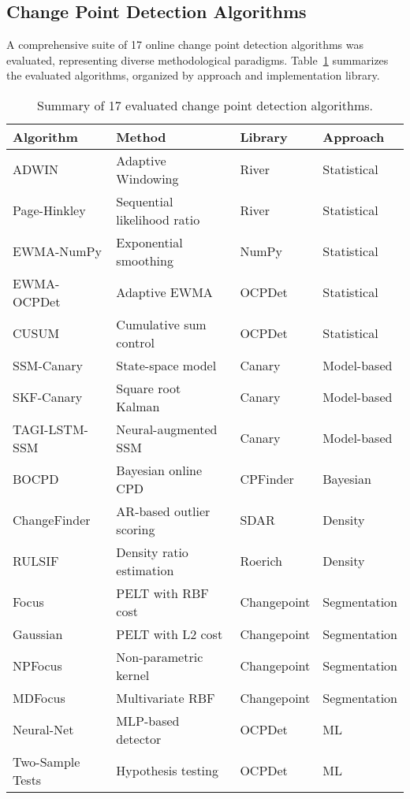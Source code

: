 \documentclass[journal,article,submit,pdftex,moreauthors]{Definitions/mdpi}
\begin{document}
\subsection{Change Point Detection Algorithms}

A comprehensive suite of 17 online change point detection algorithms was evaluated, representing diverse methodological paradigms. Table~\ref{tab:algorithms} summarizes the evaluated algorithms, organized by approach and implementation library.

\begin{table}[H]
\caption{Summary of 17 evaluated change point detection algorithms.\label{tab:algorithms}}
\centering
\begin{tabular}{llll}
\toprule
\textbf{Algorithm} & \textbf{Method} & \textbf{Library} & \textbf{Approach} \\
\midrule
ADWIN & Adaptive Windowing & River & Statistical \\
Page-Hinkley & Sequential likelihood ratio & River & Statistical \\
EWMA-NumPy & Exponential smoothing & NumPy & Statistical \\
EWMA-OCPDet & Adaptive EWMA & OCPDet & Statistical \\
CUSUM & Cumulative sum control & OCPDet & Statistical \\
\midrule
SSM-Canary & State-space model & Canary & Model-based \\
SKF-Canary & Square root Kalman & Canary & Model-based \\
TAGI-LSTM-SSM & Neural-augmented SSM & Canary & Model-based \\
\midrule
BOCPD & Bayesian online CPD & CPFinder & Bayesian \\
\midrule
ChangeFinder & AR-based outlier scoring & SDAR & Density \\
RULSIF & Density ratio estimation & Roerich & Density \\
\midrule
Focus & PELT with RBF cost & Changepoint & Segmentation \\
Gaussian & PELT with L2 cost & Changepoint & Segmentation \\
NPFocus & Non-parametric kernel & Changepoint & Segmentation \\
MDFocus & Multivariate RBF & Changepoint & Segmentation \\
\midrule
Neural-Net & MLP-based detector & OCPDet & ML \\
Two-Sample Tests & Hypothesis testing & OCPDet & ML \\
\bottomrule
\end{tabular}
\end{table}
\end{document}
